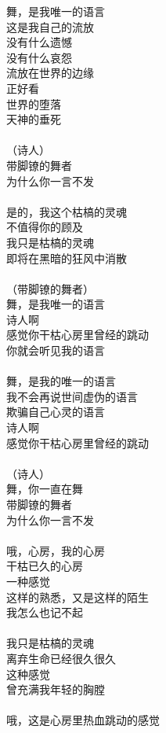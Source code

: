 舞，是我唯一的语言\\
这是我自己的流放\\
没有什么遗憾\\
没有什么哀怨\\
流放在世界的边缘\\
正好看\\
世界的堕落\\
天神的垂死\\
\\
（诗人）\\
带脚镣的舞者\\
为什么你一言不发\\
\\
是的，我这个枯槁的灵魂\\
不值得你的顾及\\
我只是枯槁的灵魂\\
即将在黑暗的狂风中消散\\
\\
（带脚镣的舞者）\\
舞，是我唯一的语言\\
诗人啊\\
感觉你干枯心房里曾经的跳动\\
你就会听见我的语言\\
\\
舞，是我的唯一的语言      \\
我不会再说世间虚伪的语言  \\
欺骗自己心灵的语言        \\
诗人啊                    \\
感觉你干枯心房里曾经的跳动\\
\\
（诗人）\\
舞，你一直在舞\\
带脚镣的舞者\\
为什么你一言不发\\
\\
哦，心房，我的心房\\
干枯已久的心房\\
一种感觉\\
这样的熟悉，又是这样的陌生\\
我怎么也记不起\\
\\
我只是枯槁的灵魂\\
离弃生命已经很久很久\\
这种感觉\\
曾充满我年轻的胸膛\\
\\
哦，这是心房里热血跳动的感觉\\
